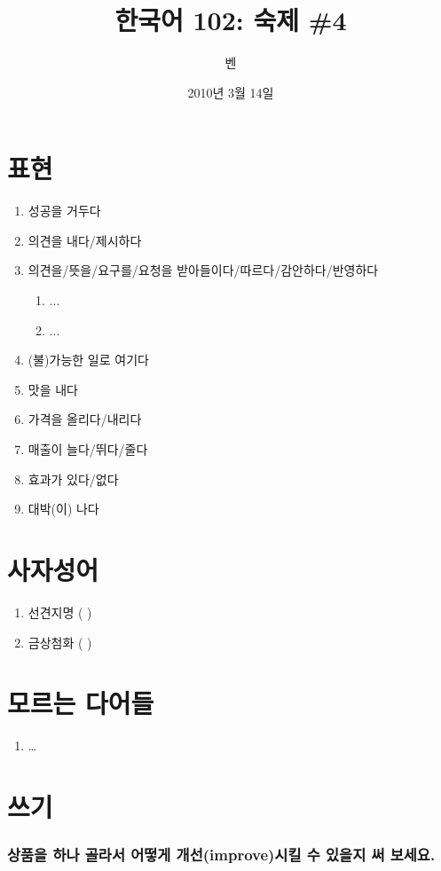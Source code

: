 \documentclass[11pt]{article}
\title{한국어 102: 숙제 \#4}
\author{벤}
\date{2010년 3월 14일}
\begin{document}
\maketitle
\thispagestyle{empty}
\pagestyle{empty}

\section{표현}
\begin{enumerate}
\item 성공을 거두다
\item 의견을 내다/제시하다
\item 의견을/뜻을/요구를/요청을 받아들이다/따르다/감안하다/반영하다
\begin{enumerate}
\item ...
\item ...
\end{enumerate}
\item (불)가능한 일로 여기다
\item 맛을 내다
\item 가격을 올리다/내리다
\item 매출이 늘다/뛰다/줄다
\item 효과가 있다/없다
\item 대박(이) 나다
\end{enumerate}

\section{사자성어}
\begin{enumerate}
\item 선견지명 (          )
\item 금상첨화 (          )
\end{enumerate}

\section{모르는 다어들}
\begin{enumerate}
  \item \ldots
\end{enumerate}
\section{쓰기}
\doublespacing
\subsubsection*{상품을 하나 골라서 어떻게 개선(improve)시킬 수 있을지 써 보세요.}
\end{document}
